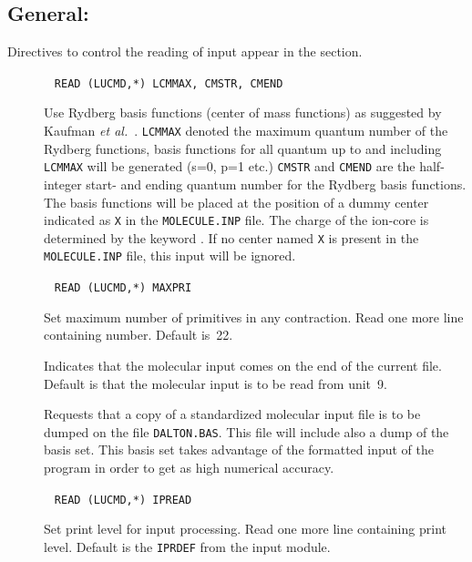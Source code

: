 \subsection{General: }\label{sec:herrdn}

Directives to control the reading of input appear in the
 section.
\begin{description}
\item[]\verb| |\newline
\verb|READ (LUCMD,*) LCMMAX, CMSTR, CMEND|

Use Rydberg basis functions (center of
mass functions) as suggested by
Kaufman {\it et al.\/}~\cite{kkwbmjjpbamop22}. \verb|LCMMAX| denoted
the maximum quantum number of the Rydberg functions, basis functions
for all quantum up to and including \verb|LCMMAX| will be generated
(s=0, p=1 etc.) \verb|CMSTR| and \verb|CMEND| are the half-integer
start- and ending quantum number for the Rydberg basis functions. The
basis functions will be placed at the position of a dummy center
indicated as \verb|X| in the \verb|MOLECULE.INP| file. The charge of
the ion-core is determined by the keyword . If no center
named \verb|X| is present in the \verb|MOLECULE.INP| file, this input
will be ignored.

\item[]\verb| |\newline
\verb|READ (LUCMD,*) MAXPRI|

Set maximum number of primitives in any
contraction.  Read one more line containing number.  Default
is~22.

\item[] Indicates that the molecular input comes on the
end of the current file. Default is that the molecular input is to be
read from unit~9.

\item[] Requests that a copy of a standardized molecular
input file is to be dumped on the file \verb|DALTON.BAS|. This file
will include also a dump of the basis set. This basis set takes
advantage of the formatted input of the program in
order to get as high numerical accuracy.

\item[]\verb| |\newline
\verb|READ (LUCMD,*) IPREAD|

Set print level for input processing.  Read one more line containing
print level. Default is the \verb|IPRDEF| from the  input
module.


\end{description}

